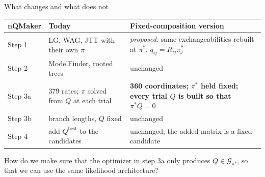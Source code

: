 \documentclass[aspectratio=169,11pt]{beamer}
\newcommand{\pis}{\pi^{\ast}}
\begin{document}
\begin{frame}{What changes and what does not}
\begin{center}
\renewcommand{\arraystretch}{1.25}
\small
\begin{tabularx}{\textwidth}{@{}p{}p{}X@{}}
\toprule
\textbf{nQMaker} & \textbf{Today} & \textbf{Fixed-composition version}\\
\midrule
Step 1 & LG, WAG, JTT with their own $\pi$ & \emph{proposed:} same exchangeabilities rebuilt at $\pis$, $q_{ij}=R_{ij}\pi^{\ast}_j$\\
Step 2 & ModelFinder, rooted trees & unchanged\\
\rowcolor{Pale}
Step 3a & 379 rates; $\pi$ solved from $Q$ at each trial & \textbf{360 coordinates; $\pis$ held fixed; every trial $Q$ is built so that $\pis Q=0$}\\
Step 3b & branch lengths, $Q$ fixed & unchanged\\
Step 4 & add $Q^{\mathrm{best}}$ to the candidates & unchanged; the added matrix is a fixed candidate\\
\bottomrule
\end{tabularx}
\end{center}
\vspace{2mm}
\alert{How do we make sure that the optimizer in step 3a only produces $Q\in\mathcal G_{\pis}$, so that we can use
the same likelihood architecture?}
\end{frame}
\end{document}
